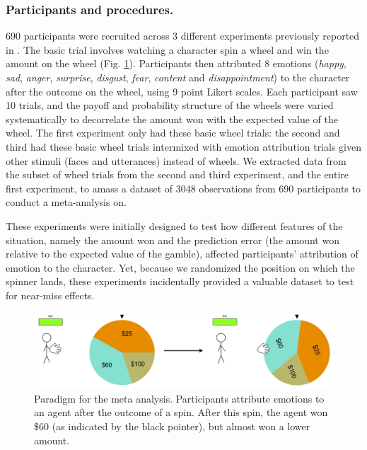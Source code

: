 \documentclass[10pt,letterpaper]{article}
\begin{document}
\subsubsection{Participants and procedures.}
	690 participants were recruited across 3 different experiments previously reported in . The basic trial involves watching a character spin a wheel and win the amount on the wheel (Fig. \ref{Expt3ParadigmFig}). Participants then attributed 8 emotions (\textit{happy}, \textit{sad}, \textit{anger}, \textit{surprise}, \textit{disgust}, \textit{fear}, \textit{content} and \textit{disappointment}) to the character after the outcome on the wheel, using 9 point Likert scales. Each participant saw 10 trials, and the payoff and probability structure of the wheels were varied systematically to decorrelate the amount won with the expected value of the wheel. The first experiment only had these basic wheel trials: the second and third had these basic wheel trials intermixed with emotion attribution trials given other stimuli (faces and utterances) instead of wheels. We extracted data from the subset of wheel trials from the second and third experiment, and the entire first experiment, to amass a dataset of 3048 observations from 690 participants to conduct a meta-analysis on.
	
	These experiments were initially designed to test how different features of the situation, namely the amount won and the prediction error (the amount won relative to the expected value of the gamble), affected participants' attribution of emotion to the character. Yet, because we randomized the position on which the spinner lands, these experiments incidentally provided a valuable dataset to test for near-miss effects.

\begin{figure}[htb!]
\includegraphics[width=\columnwidth]{images/expt3Paradigm.png}
\caption{ Paradigm for the meta analysis. Participants attribute emotions to an agent after the outcome of a spin. After this spin, the agent won \$60 (as indicated by the black pointer), but almost won a lower amount. }
\label{Expt3ParadigmFig}
\end{figure}
\end{document}
